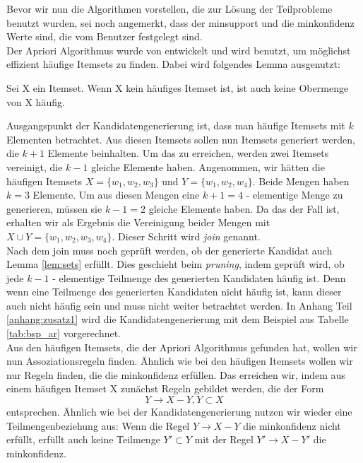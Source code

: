 Bevor wir nun die Algorithmen vorstellen, die zur Lösung der Teilprobleme benutzt wurden, sei noch angemerkt, dass der minsupport und die minkonfidenz Werte sind, die vom Benutzer festgelegt sind.
\\
Der Apriori Algorithmus wurde von \citet{AgImSw93} entwickelt und wird benutzt, um möglichst effizient häufige Itemsets zu finden. Dabei wird folgendes Lemma ausgenutzt:
\begin{lemma}
	Sei X ein Itemset. Wenn X kein häufiges Itemset ist, ist auch keine Obermenge von X häufig. \citep{AgImSw93}
	\label{lem:sets}
\end{lemma}
Ausgangspunkt der Kandidatengenerierung ist, dass man häufige Itemsets mit $k$ Elementen betrachtet. Aus diesen Itemsets sollen nun Itemsets generiert werden, die $k+1$ Elemente beinhalten. Um das zu erreichen, werden zwei Itemsets vereinigt, die $k-1$ gleiche Elemente haben. Angenommen, wir hätten die häufigen Itemsets $X = \{w_1, w_2, w_3\}$ und $Y = \{w_1, w_2, w_4\}$. Beide Mengen haben $k=3$ Elemente. Um aus diesen Mengen eine $k+1=4$ - elementige Menge zu generieren, müssen sie $k-1=2$ gleiche Elemente haben. Da das der Fall ist, erhalten wir als Ergebnis die Vereinigung beider Mengen mit $X \cup Y = \{w_1, w_2, w_3, w_4\}$. Dieser Schritt wird \textit{join} genannt.\\
Nach dem join muss noch geprüft werden, ob der generierte Kandidat auch Lemma \ref{lem:sets} erfüllt. Dies geschieht beim \textit{pruning}, indem geprüft wird, ob jede $k-1$ - elementige Teilmenge des generierten Kandidaten häufig ist. Denn wenn eine Teilmenge des generierten Kandidaten nicht häufig ist, kann dieser auch nicht häufig sein und muss nicht weiter betrachtet werden. In Anhang Teil \ref{anhang:zusatz1} wird die Kandidatengenerierung mit dem Beispiel aus Tabelle \ref{tab:bsp_ar} vorgerechnet.
\\
Aus den häufigen Itemsets, die der Apriori Algorithmus gefunden hat, wollen wir nun Assoziationsregeln finden. Ähnlich wie bei den häufigen Itemsets wollen wir nur Regeln finden, die die minkonfidenz erfüllen. Das erreichen wir, indem aus einem häufigen Itemset X zunächst Regeln gebildet werden, die der Form 
\begin{equation*}
Y \rightarrow X - Y, Y \subset X
\end{equation*}
entsprechen. Ähnlich wie bei der Kandidatengenerierung nutzen wir wieder eine Teilmengenbeziehung aus: Wenn die Regel $Y \rightarrow X - Y$ die minkonfidenz nicht erfüllt, erfüllt auch keine Teilmenge $Y' \subset Y$ mit der Regel $Y' \rightarrow X - Y'$ die minkonfidenz.

\clearpage
